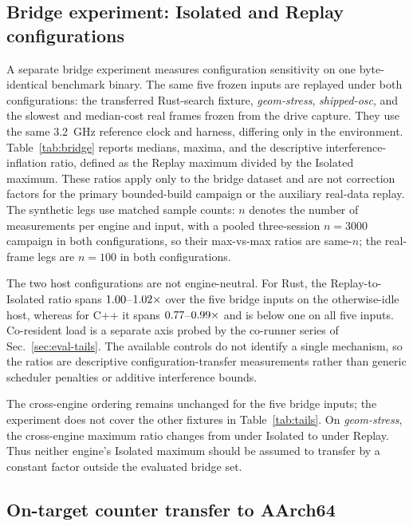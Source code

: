 \subsection{Bridge experiment: Isolated and Replay configurations}
\label{sec:eval-bridge}
A separate bridge experiment measures configuration sensitivity on one byte-identical
benchmark binary. The same five frozen inputs are replayed under both configurations: the transferred
Rust-search fixture, \emph{geom-stress}, \emph{shipped-osc}, and the slowest and
median-cost real frames frozen from the drive capture. They
use the same \SI{3.2}{GHz} reference clock and harness, differing only in the environment.
Table~\ref{tab:bridge} reports medians, maxima, and the descriptive
interference-inflation ratio, defined as the Replay maximum divided by the Isolated maximum.
These ratios apply only to the bridge dataset and are not correction factors for the primary
bounded-build campaign or the auxiliary real-data replay. The synthetic legs use matched sample counts: $n$ denotes the number of measurements per
engine and input, with a pooled three-session $n{=}3000$ campaign in both configurations, so their
max-vs-max ratios are same-$n$; the real-frame legs are $n{=}100$ in both configurations.



The two host configurations are not engine-neutral. For Rust, the Replay-to-Isolated
ratio spans $1.00$--$1.02\times$ over the five bridge inputs
on the otherwise-idle host, whereas for C++ it spans
$0.77$--$0.99\times$ and is below one on all five inputs.
Co-resident load is a separate axis probed by the co-runner series of
Sec.~\ref{sec:eval-tails}. The available controls do
not identify a single mechanism, so the ratios are descriptive configuration-transfer
measurements rather than generic scheduler penalties or additive interference bounds.

The cross-engine ordering remains unchanged for the five bridge inputs; the experiment does
not cover the other fixtures in Table~\ref{tab:tails}. On \emph{geom-stress}, the
cross-engine maximum ratio changes from \bridgeGapBLegalWorst{} under Isolated to
\bridgeGapALegalWorst{} under Replay. Thus neither engine's Isolated maximum should be
assumed to transfer by a constant factor outside the evaluated bridge set.

\subsection{On-target counter transfer to AArch64}
\label{sec:eval-raspi4}


